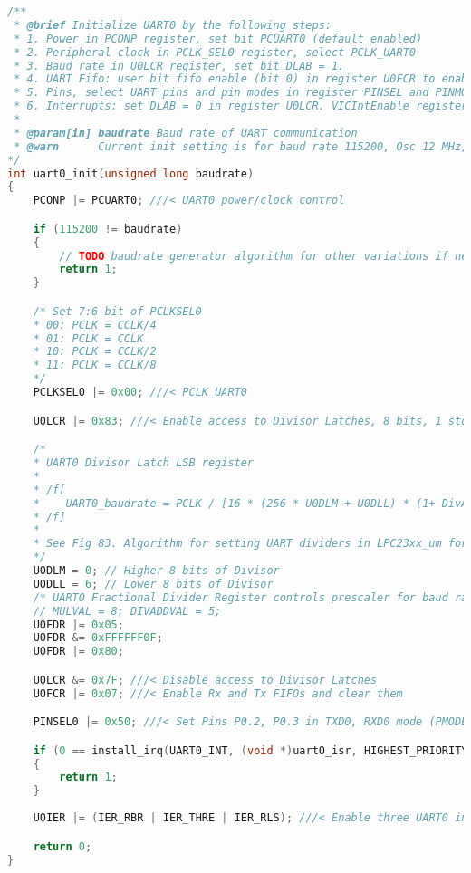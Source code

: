 \begin{lstlisting}[language={c}, caption={Initialisierung von UART0. Der Funktionsparameter \texttt{baudrate} erwartet den Wert von 115200, worauf basierend die Werte von relevanten Register vorher berechnet wurden.}, label={code:uart:init}]
/**
 * @brief Initialize UART0 by the following steps:
 * 1. Power in PCONP register, set bit PCUART0 (default enabled)
 * 2. Peripheral clock in PCLK_SEL0 register, select PCLK_UART0
 * 3. Baud rate in U0LCR register, set bit DLAB = 1.
 * 4. UART Fifo: user bit fifo enable (bit 0) in register U0FCR to enable fifo.
 * 5. Pins, select UART pins and pin modes in register PINSEL and PINMODE
 * 6. Interrupts: set DLAB = 0 in register U0LCR. VICIntEnable register in VIC.
 *
 * @param[in] baudrate Baud rate of UART communication
 * @warn      Current init setting is for baud rate 115200, Osc 12 MHz, Sysclk 72 MHz.
*/
int uart0_init(unsigned long baudrate)
{
    PCONP |= PCUART0; ///< UART0 power/clock control

    if (115200 != baudrate)
    {
        // TODO baudrate generator algorithm for other variations if needed
        return 1;
    }

    /* Set 7:6 bit of PCLKSEL0
    * 00: PCLK = CCLK/4
    * 01: PCLK = CCLK
    * 10: PCLK = CCLK/2
    * 11: PCLK = CCLK/8
    */
    PCLKSEL0 |= 0x00; ///< PCLK_UART0

    U0LCR |= 0x83; ///< Enable access to Divisor Latches, 8 bits, 1 stop bit, no parity

    /*
    * UART0 Divisor Latch LSB register
    *
    * /f[
    *    UART0_baudrate = PCLK / [16 * (256 * U0DLM + U0DLL) * (1+ DivAddVal/MulVal)]
    * /f]
    *
    * See Fig 83. Algorithm for setting UART dividers in LPC23xx_um for details.
    */
    U0DLM = 0; // Higher 8 bits of Divisor
    U0DLL = 6; // Lower 8 bits of Divisor
    /* UART0 Fractional Divider Register controls prescaler for baud rate generator */
    // MULVAL = 8; DIVADDVAL = 5;
    U0FDR |= 0x05;
    U0FDR &= 0xFFFFFF0F;
    U0FDR |= 0x80;

    U0LCR &= 0x7F; ///< Disable access to Divisor Latches
    U0FCR |= 0x07; ///< Enable Rx and Tx FIFOs and clear them

    PINSEL0 |= 0x50; ///< Set Pins P0.2, P0.3 in TXD0, RXD0 mode (PMODE has to 00 (pull-up))

    if (0 == install_irq(UART0_INT, (void *)uart0_isr, HIGHEST_PRIORITY))
    {
        return 1;
    }
    
    U0IER |= (IER_RBR | IER_THRE | IER_RLS); ///< Enable three UART0 interrupt sources: RBR, THRE, Rx Line Status

    return 0;
}
\end{lstlisting}
